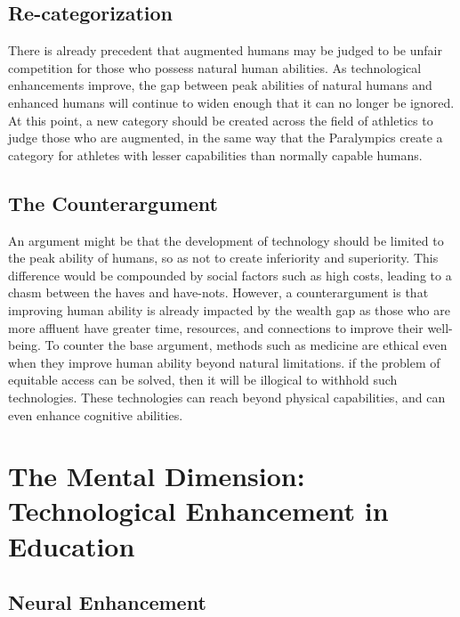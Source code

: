 \documentclass[10pt, oneside, letterpaper]{article}
\begin{document}
\begin{multicols}{2}
	\subsection{Re-categorization}

	There is already precedent that augmented humans may be judged to be unfair competition for those who possess natural human abilities. As technological enhancements improve, the gap between peak abilities of natural humans and enhanced humans will continue to widen enough that it can no longer be ignored. At this point, a new category should be created across the field of athletics to judge those who are augmented, in the same way that the Paralympics create a category for athletes with lesser capabilities than normally capable humans.

	\subsection{The Counterargument}

	An argument might be that the development of technology should be limited to the peak ability of humans, so as not to create inferiority and superiority. This difference would be compounded by social factors such as high costs, leading to a chasm between the haves and have-nots. However, a counterargument is that improving human ability is already impacted by the wealth gap as those who are more affluent have greater time, resources, and connections to improve their well-being. To counter the base argument, methods such as medicine are ethical even when they improve human ability beyond natural limitations. if the problem of equitable access can be solved, then it will be illogical to withhold such technologies. These technologies can reach beyond physical capabilities, and can even enhance cognitive abilities.

	\section{The Mental Dimension: Technological Enhancement in Education}

	\subsection{Neural Enhancement}


\end{multicols}
\end{document}
